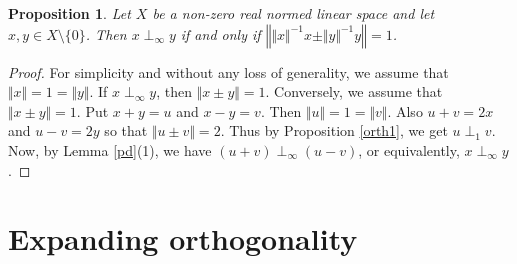 \documentclass[12pt]{amsart}
\newtheorem{proposition}[theorem]{Proposition}
\begin{document}
\begin{proposition}\label{oinfty}
	Let $X$ be a non-zero real normed linear space and let $x, y \in X \setminus \lbrace 0 \rbrace$. Then $x \perp_{\infty} y$ if and only if $\left\Vert \Vert x \Vert^{-1} x \pm \Vert y \Vert^{-1} y \right\Vert = 1$. 
\end{proposition} 
\begin{proof}
	For simplicity and without any loss of generality, we assume that $\Vert x \Vert = 1 = \Vert y \Vert$. If $x \perp_{\infty} y$, then $\Vert x \pm y \Vert = 1$. Conversely, we assume that $\Vert x \pm y \Vert = 1$. Put $x + y = u$ and $x - y = v$. Then $\Vert u \Vert = 1 = \Vert v \Vert$. Also $u + v = 2 x$ and $u - v = 2 y$ so that $\Vert u \pm v \Vert = 2$. Thus by Proposition \ref{orth1}, we get $u \perp_1 v$. Now, by Lemma \ref{pd}(1), we have $(u + v) \perp_{\infty} (u - v)$, or equivalently, $x \perp_{\infty} y$. 
\end{proof} 

\section{Expanding orthogonality} 
\end{document}
